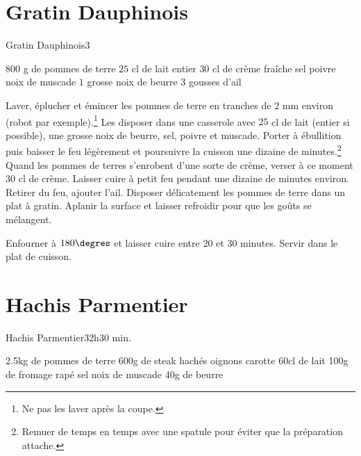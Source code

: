 {\section{Gratin Dauphinois}
\begin{recette}{Gratin Dauphinois}{3}{}{}
\begin{ingredients}
\ingredient $800$ g de pommes de terre
\ingredient $25$ cl de lait entier
\ingredient $30$ cl de crème fraîche
\ingredient sel
\ingredient poivre
\ingredient noix de muscade
\ingredient $1$ grosse noix de beurre
\ingredient $3$ gousses d'ail
\end{ingredients}

\begin{preparation}
\etape Laver, éplucher et émincer les pommes de terre en tranches de $2$ mm environ (robot par exemple).\footnote{Ne pas les laver après la coupe.}
\etape Les disposer dans une casserole avec $25$ cl de lait (entier si possible), une grosse noix de beurre, sel, poivre et 
muscade.
\etape Porter à ébullition puis baisser le feu légèrement et poursuivre la cuisson une dizaine de minutes.\footnote{Remuer de 
temps en temps avec une spatule pour éviter que la préparation attache.}
\etape Quand les pommes de terres s'enrobent d'une sorte de crème, verser à ce moment $30$ cl de crème.
\etape Laisser cuire à petit feu pendant une dizaine de minutes environ.
\etape Retirer du feu, ajouter l'ail.
\etape Disposer délicatement les pommes de terre dans un plat à gratin.
\etape Aplanir la surface et laisser refroidir pour que les goûts se mélangent.
\end{preparation}

\begin{cuisson}
Enfourner à $180\degres$ et laisser cuire entre $20$ et $30$ minutes. Servir dans le plat de cuisson.
\end{cuisson}
\end{recette}

\section{Hachis Parmentier}
\begin{recette}{Hachis Parmentier}{3}{2h}{30 min.}
\begin{ingredients}
\ingredient 2.5kg de pommes de terre
\ingredient 600g de steak hachés
 oignons
 carotte
\ingredient 60cl de lait
\ingredient 100g de fromage rapé
\ingredient sel
\ingredient noix de muscade
\ingredient 40g de beurre
\end{ingredients}


\end{recette}}
